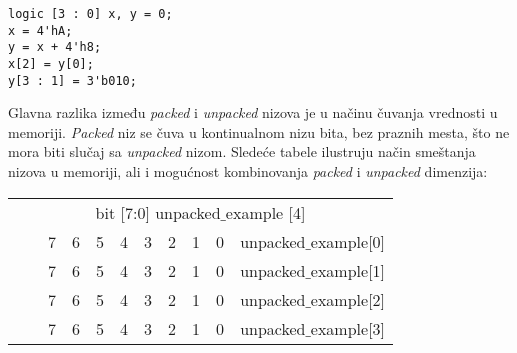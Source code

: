 \begin{lstlisting}
logic [3 : 0] x, y = 0;
x = 4'hA;
y = x + 4'h8;
x[2] = y[0];
y[3 : 1] = 3'b010;
\end{lstlisting}

Glavna razlika između \emph{packed} i \emph{unpacked} nizova je u načinu čuvanja
vrednosti u memoriji.
\emph{Packed} niz se čuva u kontinualnom nizu bita, bez praznih mesta, što ne
mora biti slučaj sa \emph{unpacked} nizom.
Sledeće tabele ilustruju način smeštanja nizova u memoriji, ali i mogućnost
kombinovanja \emph{packed} i \emph{unpacked} dimenzija:

\begin{center}
\end{center}

\begin{center}
  \begin{tabular}{|c|c|c|c|c|c|c|c|c|c|c}
    \multicolumn{11}{c}{bit [7:0] unpacked\(\_\)example [4]}\\\cline{0-9}
    &&7&6&5&4&3&2&1&0&unpacked\(\_\)example[0]\\\cline{0-9}
    &&7&6&5&4&3&2&1&0&unpacked\(\_\)example[1]\\\cline{0-9}
    &&7&6&5&4&3&2&1&0&unpacked\(\_\)example[2]\\\cline{0-9}
    &&7&6&5&4&3&2&1&0&unpacked\(\_\)example[3]\\\cline{0-9}
  \end{tabular}
\end{center}

